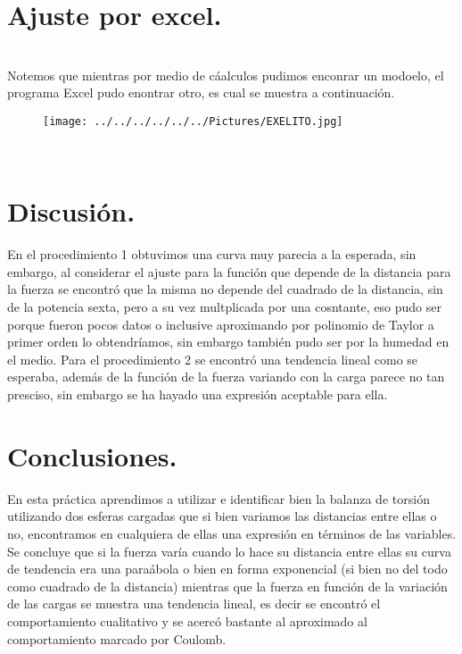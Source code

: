 \documentclass[11pt,a4paper]{article}
\begin{document}
{\section*{Ajuste por excel.}\\
Notemos que mientras por medio de c\'{a}alculos pudimos enconrar un modoelo, el programa Excel pudo enontrar otro, es cual se muestra a continuaci\'{o}n.
\\
\begin{figure}[hbtp]
 \centering
\texttt{[image: ../../../../../../Pictures/EXELITO.jpg]} 
\end{figure}
\\
\pagebreak

\section{Discusi\'{o}n.}
En el procedimiento 1 obtuvimos una curva  muy parecia a la esperada, sin embargo, al considerar el ajuste para la funci\'{o}n que depende de la distancia para la fuerza se encontr\'{o} que la misma no depende del cuadrado de la distancia, sin de la potencia sexta, pero a su vez multplicada por una cosntante, eso pudo ser porque fueron pocos datos o inclusive aproximando por polinomio de Taylor a primer orden lo obtendr\'{i}amos, sin embargo tambi\'{e}n pudo ser por la humedad en el medio. Para el procedimiento 2 se encontr\'{o} una tendencia lineal como se esperaba, adem\'{a}s de la funci\'{o}n de la fuerza variando con la carga parece no tan presciso, sin embargo se ha hayado una expresi\'{o}n aceptable para ella. 


\section{Conclusiones.}
En esta pr\'{a}ctica aprendimos a utilizar e identificar bien la balanza de torsi\'{o}n utilizando dos esferas cargadas que si bien variamos las distancias entre ellas o no, encontramos en cualquiera de ellas una expresi\'{o}n en t\'{e}rminos de las variables. Se concluye que si la fuerza var\'{i}a cuando lo hace su distancia entre ellas su curva de tendencia era una para\'{a}bola o bien en forma exponencial  (si bien no del todo como cuadrado de la distancia) mientras que la fuerza en funci\'{o}n de la variaci\'{o}n de las cargas se muestra una tendencia lineal, es decir se encontr\'{o} el comportamiento cualitativo y se acerc\'{o} bastante al aproximado al comportamiento marcado por Coulomb.

}
\end{document}
